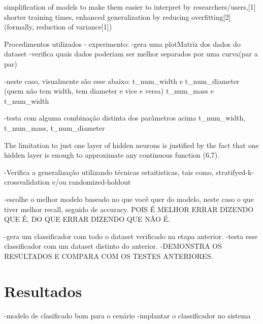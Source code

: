         simplification of models to make them easier to interpret by researchers/users,[1]
        shorter training times,
        enhanced generalization by reducing overfitting[2](formally, reduction of variance[1])

Procedimentos utilizados - experimento:
-gera uma plotMatriz dos dados do dataset
-verifica quais dados poderiam ser melhor separados por uma curva(par a par)

-neste caso, visualmente são esse abaixo:
t_num_width e t_num_diameter
(quem não tem width, tem diameter e vice e versa)
t_num_mass e t_num_width

-testa com alguma combinação distinta dos parâmetros acima
t_num_width, t_num_mass, t_num_diameter 

The limitation to just one layer of hidden neurons is justified by the fact that one hidden layer is enough to approximate any continuous function (6,7).\cite{Pasini:2015}

-Verifica a generalização utilizando técnicas estaitisticas, tais como, stratifyed-k-crossvalidation e/ou randomized-holdout

-escolhe o melhor modelo baseado no que você quer do modelo, neste caso o que tiver melhor recall, seguido de accuracy. POIS É MELHOR ERRAR DIZENDO QUE É, DO QUE ERRAR DIZENDO QUE NÃO É.

-gera um classificador com todo o dataset verificado na etapa anterior.
-testa esse classificador com um dataset distinto do anterior.
-DEMONSTRA OS RESULTADOS E COMPARA COM OS TESTES ANTERIORES.
\section{Resultados}
-modelo de clasificado bom para o cenário
-implantar o classificador no sistema
